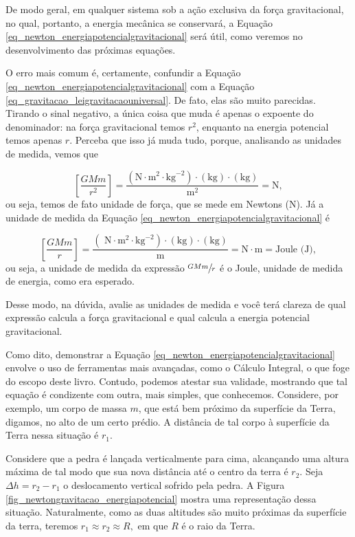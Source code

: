De modo geral, em qualquer sistema sob a ação exclusiva da força gravitacional, no qual, portanto, a energia mecânica se conservará, a Equação \eqref{eq_newton_energiapotencialgravitacional} será útil, como veremos no desenvolvimento das próximas equações.



O erro mais comum é, certamente, confundir a Equação \eqref{eq_newton_energiapotencialgravitacional} com a Equação \eqref{eq_gravitacao_leigravitacaouniversal}. De fato, elas são muito parecidas. Tirando o sinal negativo, a única coisa que muda é apenas o expoente do denominador: na força gravitacional temos $r^2$, enquanto na energia potencial temos apenas $r.$ Perceba que isso já muda tudo, porque, analisando as unidades de medida, vemos que 

$$ \left[\dfrac{GMm}{r^2} \right ] = \dfrac{(\text{N} \cdot \text{m}^2 \cdot \text{kg}^{-2}) \cdot (\text{kg})\cdot (\text{kg})}{\text{m}^2} = \text{N}, $$
\noindent ou seja, temos de fato unidade de força, que se mede em Newtons (N). Já a unidade de medida da Equação \eqref{eq_newton_energiapotencialgravitacional} é

$$ \left[\dfrac{GMm}{r} \right ] = \dfrac{(\text{ N} \cdot \text{m}^2 \cdot \text{kg}^{-2}) \cdot (\text{kg})\cdot (\text{kg})}{\text{m}} = \text{N} \cdot \text{m} = \text{Joule (J)}, $$
\noindent ou seja, a unidade de medida da expressão $\sfrac{GMm}{r}$ é o Joule, unidade de medida de energia, como era esperado.

Desse modo, na dúvida, avalie as unidades de medida e você terá clareza de qual expressão calcula a força gravitacional e qual calcula a energia potencial gravitacional.





Como dito, demonstrar a Equação \eqref{eq_newton_energiapotencialgravitacional} envolve o uso de ferramentas mais avançadas, como o Cálculo Integral, o que foge do escopo deste livro. Contudo, podemos atestar sua validade, mostrando que tal equação é condizente com outra, mais simples, que conhecemos. Considere, por exemplo, um corpo de massa $m$, que está bem próximo da superfície da Terra, digamos, no alto de um certo prédio. A distância de tal corpo à superfície da Terra nessa situação é $r_1.$

Considere que a pedra é lançada verticalmente para cima, alcançando uma altura máxima de tal modo que sua nova distância até o centro da terra é $r_2.$ Seja $\Delta h = r_2 - r_1$ o deslocamento vertical sofrido pela pedra. A Figura \ref{fig_newtongravitacao_energiapotencial} mostra uma representação dessa situação. Naturalmente, como as duas altitudes são muito próximas da superfície da terra, teremos $r_1 \approx r_2 \approx R,$ em que $R$ é o raio da Terra.

